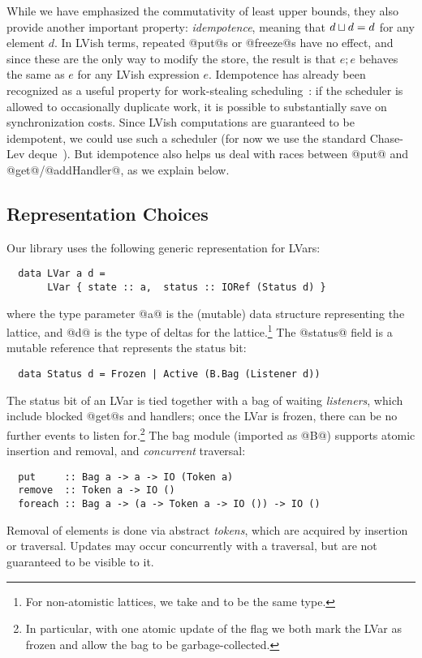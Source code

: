 While we have emphasized the commutativity of least upper bounds, they also
provide another important property: \emph{idempotence}, meaning that
$d \sqcup d = d$ for any element $d$.  In LVish terms, repeated @put@s or @freeze@s
have no effect, and since these are the only way to modify the store, the
result is that $e; e$ behaves the same as $e$ for any LVish expression $e$.  
Idempotence has already been recognized as a useful property for work-stealing
scheduling~\cite{idempotent}: if the scheduler is allowed to occasionally duplicate work, it is
possible to substantially save on synchronization costs.  Since LVish
computations are guaranteed to be idempotent, we could use such a scheduler
(for now we use the standard Chase-Lev deque~\cite{ChaseLev}).  But idempotence
also helps us deal with races between @put@ and @get@/@addHandler@, as we explain below.

\subsection{Representation Choices}
Our library uses the following generic representation for LVars:
\begin{lstlisting}
  data LVar a d = 
       LVar { state :: a,  status :: IORef (Status d) }
\end{lstlisting}
where the type parameter @a@ is the (mutable) data structure representing the
lattice, and @d@ is the type of deltas for the lattice.\footnote{For
  non-atomistic lattices, we take  and  to be the same type.}
The @status@ field is a mutable reference that represents the status bit:
\begin{lstlisting}
  data Status d = Frozen | Active (B.Bag (Listener d))
\end{lstlisting}
The status bit of an LVar is tied together with a bag of waiting
\emph{listeners}, which include blocked @get@s and handlers; once the LVar is
frozen, there can be no further events to listen for.\footnote{In particular,
  with one atomic update of the flag we both mark the LVar as frozen and allow
  the bag to be garbage-collected.}  The bag module (imported as @B@) supports
atomic insertion and removal, and \emph{concurrent} traversal:
\begin{lstlisting}
  put     :: Bag a -> a -> IO (Token a)
  remove  :: Token a -> IO ()
  foreach :: Bag a -> (a -> Token a -> IO ()) -> IO ()
\end{lstlisting}
Removal of elements is done via abstract \emph{tokens}, which are acquired by
insertion or traversal.  Updates may occur concurrently with a traversal, but
are not guaranteed to be visible to it.

